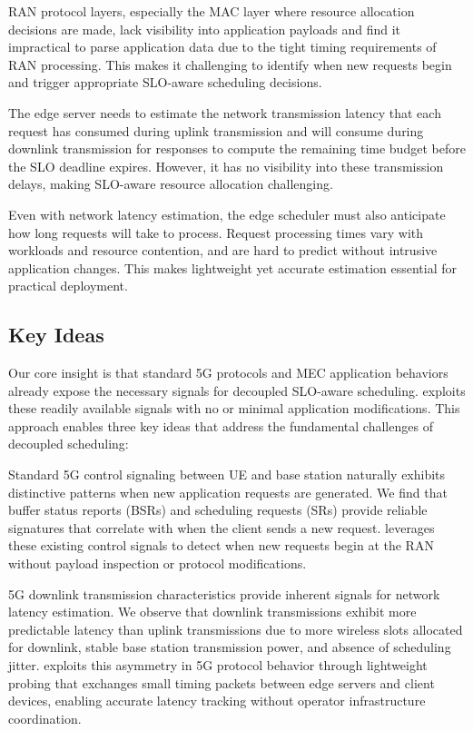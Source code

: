 RAN protocol layers, especially the MAC layer where resource allocation decisions are made, lack visibility into application payloads and find it impractical to parse application data due to the tight timing requirements of RAN processing.
This makes it challenging to identify when new requests begin and trigger appropriate SLO-aware scheduling decisions.

The edge server needs to estimate the network transmission latency that each request has consumed during uplink transmission and will consume during downlink transmission for responses to compute the remaining time budget before the SLO deadline expires.
However, it has no visibility into these transmission delays, making SLO-aware resource allocation challenging.

Even with network latency estimation, the edge scheduler must also anticipate how long requests will take to process. 
Request processing times vary with workloads and resource contention, and are hard to predict without intrusive application changes. 
This makes lightweight yet accurate estimation essential for practical deployment.

\subsection{Key Ideas}
\label{sec:insights}

Our core insight is that standard 5G protocols and MEC application behaviors already expose the necessary signals for decoupled SLO-aware scheduling.
\sys{} exploits these readily available signals with no or minimal application modifications.
This approach enables three key ideas that address the fundamental challenges of decoupled scheduling:

Standard 5G control signaling between UE and base station naturally exhibits distinctive patterns when new application requests are generated.
We find that buffer status reports (BSRs) and scheduling requests (SRs) provide reliable signatures that correlate with when the client sends a new request.
\sys{} leverages these existing control signals to detect when new requests begin at the RAN without payload inspection or protocol modifications.

5G downlink transmission characteristics provide inherent signals for network latency estimation.
We observe that downlink transmissions exhibit more predictable latency than uplink transmissions due to more wireless slots allocated for downlink, stable base station transmission power, and absence of scheduling jitter.
\sys{} exploits this asymmetry in 5G protocol behavior through lightweight probing that exchanges small timing packets between edge servers and client devices, enabling accurate latency tracking without operator infrastructure coordination.

